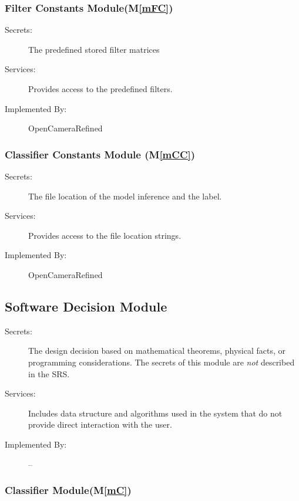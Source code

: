 \documentclass[12pt, titlepage]{article}
\newcommand{\mref}[1]{M\ref{#1}}
\begin{document}
\subsubsection{Filter Constants Module(\mref{mFC})}

\begin{description}
\item[Secrets:]The predefined stored filter matrices 
\item[Services:]Provides access to the predefined filters.
\item[Implemented By:] OpenCameraRefined
\end{description}

\subsubsection{Classifier Constants Module (\mref{mCC})}

\begin{description}
\item[Secrets:]The file location of the model inference and the label.
\item[Services:]Provides access to the file location strings.
\item[Implemented By:] OpenCameraRefined
\end{description}


\subsection{Software Decision Module}

\begin{description}
\item[Secrets:] The design decision based on mathematical theorems, physical
  facts, or programming considerations. The secrets of this module are
  \emph{not} described in the SRS.
\item[Services:] Includes data structure and algorithms used in the system that
  do not provide direct interaction with the user. 
\item[Implemented By:] --
\end{description}

\subsubsection{Classifier Module(\mref{mC})}
\end{document}
